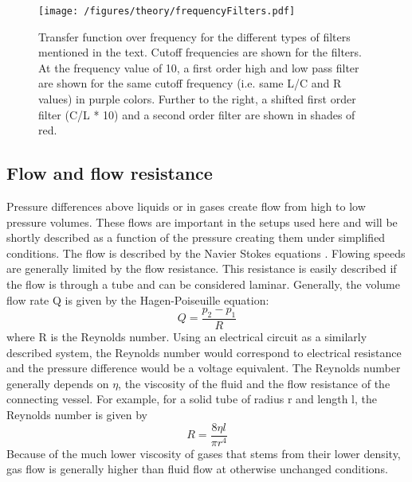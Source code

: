             \begin{figure}
                \centering
                \texttt{[image: /figures/theory/frequencyFilters.pdf]}
                \caption[Frequency filters]{Transfer function over frequency for the different types of filters mentioned in the text. Cutoff frequencies are shown for the filters. At the frequency value of 10, a first order high and low pass filter are shown for the same cutoff frequency (i.e. same L/C and R values) in purple colors. Further to the right, a shifted first order filter (C/L * 10) and a second order filter are shown in shades of red.}
                \label{figure:theory:frequencyFilter}
            \end{figure}
            \subsection{Flow and flow resistance}
                Pressure differences above liquids or in gases create flow from high to low pressure volumes. These flows are important in the setups used here and will be shortly described as a function of the pressure creating them under simplified conditions. The flow is described by the Navier Stokes equations \cite{sochi_flow_2013}.
                Flowing speeds are generally limited by the flow resistance. This resistance is easily described if the flow is through a tube and can be considered laminar. Generally, the volume flow rate Q is given by the Hagen-Poiseuille equation:
                \begin{equation}
                    Q=\frac{p_2-p_1}{R}
                \end{equation}
                where R is the Reynolds number. Using an electrical circuit as a similarly described system, the Reynolds number would correspond to electrical resistance and the pressure difference would be a voltage equivalent. The Reynolds number generally depends on $\eta$, the viscosity of the fluid and the flow resistance of the connecting vessel. For example, for a solid tube of radius r and length l, the Reynolds number is given by \cite{jeffrey_particle_1965}
                \begin{equation}
                    R=\frac{8\eta l}{\pi r^4}
                \end{equation}
                Because of the much lower viscosity of gases that stems from their lower density, gas flow is generally higher than fluid flow at otherwise unchanged conditions.
